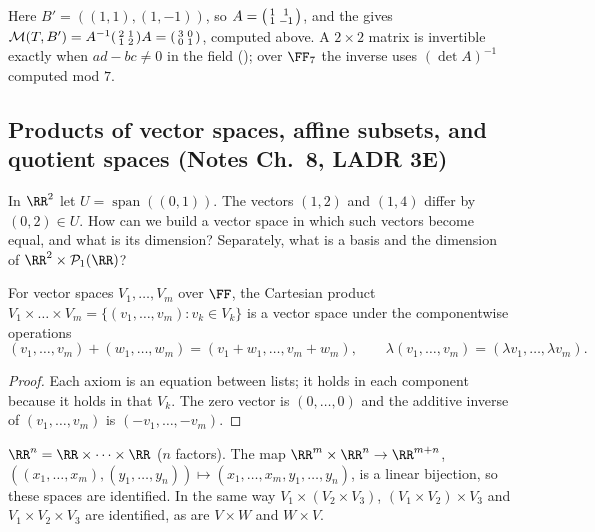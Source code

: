 \documentclass[10pt]{scrartcl}
\DeclareMathOperator{\spn}{span}\DeclareMathOperator{\nul}{null}\DeclareMathOperator{\range}{range}
\newcommand{\PP}{\mathcal P}\newcommand{\LL}{\mathcal L}\newcommand{\MM}{\mathcal M}
\begin{document}
\revisit Here $B'=((1,1),(1,-1))$, so $A=\begin{psmallmatrix}1&1\\1&-1\end{psmallmatrix}$, and the  gives $\MM(T,B')=A^{-1}\begin{psmallmatrix}2&1\\1&2\end{psmallmatrix}A=\begin{psmallmatrix}3&0\\0&1\end{psmallmatrix}$, computed above. A $2\times2$ matrix is invertible exactly when $ad-bc\ne0$ in the field (); over $\FF_7$ the inverse uses $(\det A)^{-1}$ computed mod $7$.

\subsection{Products of vector spaces, affine subsets, and quotient spaces (Notes Ch.~8, LADR 3E)}

\begin{qbox}
  In $\RR^2$ let $U=\spn((0,1))$. The vectors $(1,2)$ and $(1,4)$ differ by $(0,2)\in U$. How can we build a vector space in which such vectors become equal, and what is its dimension? Separately, what is a basis and the dimension of $\RR^2\times\PP_1(\RR)$?
\end{qbox}

\begin{proposition*}
  For vector spaces $V_1,\dots,V_m$ over $\FF$, the Cartesian product $V_1\times\dots\times V_m=\{(v_1,\dots,v_m):v_k\in V_k\}$ is a vector space under the componentwise operations
  \[
    (v_1,\dots,v_m)+(w_1,\dots,w_m)=(v_1+w_1,\dots,v_m+w_m),\qquad \lambda(v_1,\dots,v_m)=(\lambda v_1,\dots,\lambda v_m).
  \]
\end{proposition*}
\begin{proof}
  Each axiom is an equation between lists; it holds in each component because it holds in that $V_k$. The zero vector is $(0,\dots,0)$ and the additive inverse of $(v_1,\dots,v_m)$ is $(-v_1,\dots,-v_m)$.
\end{proof}

\begin{example*}
  $\RR^n=\RR\times\dots\times\RR$ ($n$ factors). The map $\RR^m\times\RR^n\to\RR^{m+n}$, $((x_1,\dots,x_m),(y_1,\dots,y_n))\mapsto(x_1,\dots,x_m,y_1,\dots,y_n)$, is a linear bijection, so these spaces are identified. In the same way $V_1\times(V_2\times V_3)$, $(V_1\times V_2)\times V_3$ and $V_1\times V_2\times V_3$ are identified, as are $V\times W$ and $W\times V$.
\end{example*}
\end{document}
